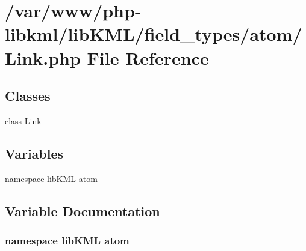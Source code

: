 \hypertarget{field__types_2atom_2Link_8php}{
\section{/var/www/php-\/libkml/libKML/field\_\-types/atom/Link.php File Reference}
\label{da/d91/field__types_2atom_2Link_8php}
}
\subsection*{Classes}
\begin{DoxyCompactItemize}
\item 
class \hyperlink{classLink}{Link}
\end{DoxyCompactItemize}
\subsection*{Variables}
\begin{DoxyCompactItemize}
\item 
namespace libKML \hyperlink{field__types_2atom_2Link_8php_a394f9de8c2b62e5746df974d1d89617b}{atom}
\end{DoxyCompactItemize}


\subsection{Variable Documentation}
\hypertarget{field__types_2atom_2Link_8php_a394f9de8c2b62e5746df974d1d89617b}{
\subsubsection[{atom}]{\setlength{\rightskip}{0pt plus 5cm}namespace libKML {\bf atom}}}
\label{da/d91/field__types_2atom_2Link_8php_a394f9de8c2b62e5746df974d1d89617b}
